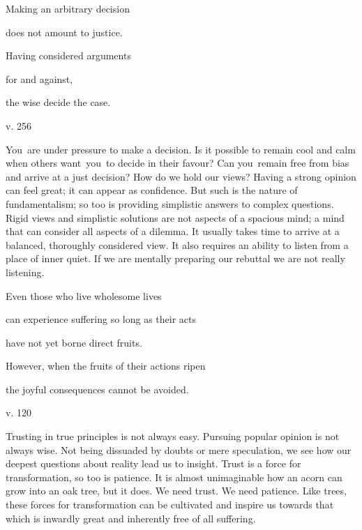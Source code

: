 \documentclass[a4paper,portrait,12pt]{article}
\begin{document}
Making an arbitrary decision


does not amount to justice.


Having considered arguments 


for and against, 


the wise decide the case.





v. 256





You are under pressure to make a decision. Is it possible to remain cool and calm when others want you to decide in their favour? Can you remain free from bias and arrive at a just decision? How do we hold our views? Having a strong opinion can feel great; it can appear as confidence. But such is the nature of fundamentalism; so too is providing simplistic answers to complex questions. Rigid views and simplistic solutions are not aspects of a spacious mind; a mind that can consider all aspects of a dilemma. It usually takes time to arrive at a balanced, thoroughly considered view. It also requires an ability to listen from a place of inner quiet. If we are mentally preparing our rebuttal we are not really listening.














Even those who live wholesome lives 


can experience suffering so long as their acts 


have not yet borne direct fruits. 


However, when the fruits of their actions ripen


the joyful consequences cannot be avoided.





v. 120





Trusting in true principles is not always easy. Pursuing popular opinion is not always wise. Not being dissuaded by doubts or mere speculation, we see how our deepest questions about reality lead us to insight. Trust is a force for transformation, so too is patience. It is almost unimaginable how an acorn can grow into an oak tree, but it does. We need trust. We need patience. Like trees, these forces for transformation can be cultivated and inspire us towards that which is inwardly great and inherently free of all suffering.
\end{document}
